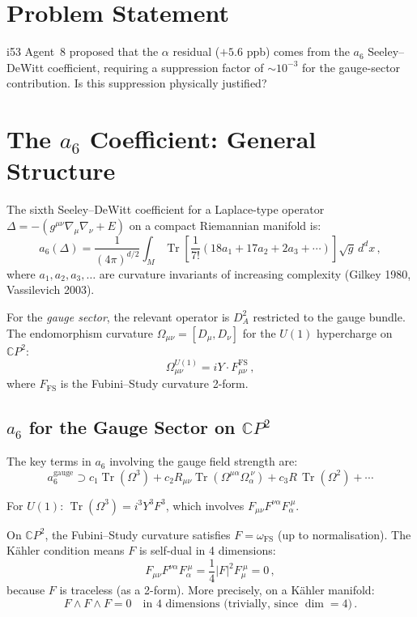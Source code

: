 \documentclass[11pt,a4paper]{article}
\newcommand{\Tr}{\operatorname{Tr}}
\newcommand{\CP}{\mathbb{C}P}
\begin{document}
\section{Problem Statement}

i53 Agent~8 proposed that the $\alpha$ residual ($+5.6$ ppb) comes from the $a_6$ Seeley--DeWitt coefficient, requiring a suppression factor of $\sim 10^{-3}$ for the gauge-sector contribution. Is this suppression physically justified?

\section{The $a_6$ Coefficient: General Structure}

The sixth Seeley--DeWitt coefficient for a Laplace-type operator $\Delta = -(g^{\mu\nu}\nabla_\mu\nabla_\nu + E)$ on a compact Riemannian manifold is:
\begin{equation}
a_6(\Delta) = \frac{1}{(4\pi)^{d/2}}\int_M \Tr\left[\frac{1}{7!}(18a_1 + 17a_2 + 2a_3 + \cdots)\right]\sqrt{g}\,d^dx\,,
\end{equation}
where $a_1, a_2, a_3, \ldots$ are curvature invariants of increasing complexity (Gilkey 1980, Vassilevich 2003).

For the \emph{gauge sector}, the relevant operator is $D_A^2$ restricted to the gauge bundle. The endomorphism curvature $\Omega_{\mu\nu} = [D_\mu, D_\nu]$ for the $U(1)$ hypercharge on $\CP^2$:
\begin{equation}
\Omega_{\mu\nu}^{U(1)} = iY \cdot F_{\mu\nu}^{\mathrm{FS}}\,,
\end{equation}
where $F_{\mathrm{FS}}$ is the Fubini--Study curvature 2-form.

\subsection{$a_6$ for the Gauge Sector on $\CP^2$}

The key terms in $a_6$ involving the gauge field strength are:
\begin{equation}
a_6^{\mathrm{gauge}} \supset c_1 \Tr(\Omega^3) + c_2 R_{\mu\nu}\Tr(\Omega^{\mu\alpha}\Omega_{\alpha}^{\ \nu}) + c_3 R\,\Tr(\Omega^2) + \cdots
\end{equation}

For $U(1)$: $\Tr(\Omega^3) = i^3 Y^3 F^3$, which involves $F_{\mu\nu}F^{\nu\alpha}F_{\alpha}^{\ \mu}$.

On $\CP^2$, the Fubini--Study curvature satisfies $F = \omega_{\mathrm{FS}}$ (up to normalisation). The K\"ahler condition means $F$ is self-dual in 4 dimensions:
\begin{equation}
F_{\mu\nu}F^{\nu\alpha}F_{\alpha}^{\ \mu} = \frac{1}{4}|F|^2 F_{\mu}^{\ \mu} = 0\,,
\end{equation}
because $F$ is traceless (as a 2-form). More precisely, on a K\"ahler manifold:
\begin{equation}
F \wedge F \wedge F = 0 \quad \text{in 4 dimensions (trivially, since } \dim = 4 \text{)}\,.
\end{equation}
\end{document}

